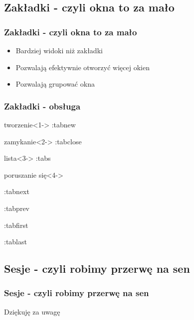 \documentclass{beamer}
\begin{document}
\subsection{Zakładki - czyli okna to za mało}
\begin{frame}
	\frametitle{Zakładki - czyli okna to za mało}
	\begin{itemize}[<+->]
	\item Bardziej widoki niż zakładki
	\item Pozwalają efektywnie otworzyć więcej okien
	\item Pozwalają grupować okna
	\end{itemize}
\end{frame}
\begin{frame}
	\frametitle{Zakładki - obsługa}
	\begin{block}{tworzenie}<1->
		:tabnew
	\end{block}
	\begin{block}{zamykanie}<2->
		:tabclose
	\end{block}
	\begin{block}{lista}<3->
	:tabs
	\end{block}
	\begin{block}{poruszanie się}<4->
		\begin{itemize}
			{ \item :tabnext }
			{ \item :tabprev }
			{ \item :tabfirst }
			{ \item :tablast }
		\end{itemize}
	\end{block}
\end{frame}
\subsection{Sesje - czyli robimy przerwę na sen}
\begin{frame}
	\frametitle{Sesje - czyli robimy przerwę na sen}

\end{frame}
\begin{frame}
	Dziękuję za uwagę
\end{frame}
\end{document}
